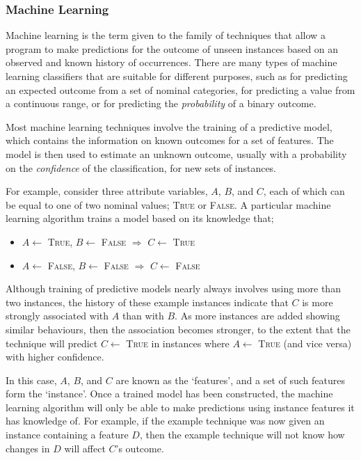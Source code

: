 \subsubsection{Machine Learning}
Machine learning is the term given to the family of techniques that allow a program to make predictions for the outcome of unseen instances based on an observed and known history of occurrences. There are many types of machine learning classifiers that are suitable for different purposes, such as for predicting an expected outcome from a set of nominal categories, for predicting a value from a continuous range, or for predicting the \textit{probability} of a binary outcome.

Most machine learning techniques involve the training of a predictive model, which contains the information on known outcomes for a set of features. The model is then used to estimate an unknown outcome, usually with a probability on the \textit{confidence} of the classification, for new sets of instances.

For example, consider three attribute variables, $A$, $B$, and $C$, each of which can be equal to one of two nominal values; \textsc{True} or \textsc{False}. A particular machine learning algorithm trains a model based on its knowledge that;
\begin{itemize}
    \item $A\gets$ \textsc{True}, $B\gets$ \textsc{False} $\Longrightarrow$ $C\gets$ \textsc{True}
    \item $A\gets$ \textsc{False}, $B\gets$ \textsc{False} $\Longrightarrow$ $C\gets$ \textsc{False}
\end{itemize}
Although training of predictive models nearly always involves using more than two instances, the history of these example instances indicate that $C$ is more strongly associated with $A$ than with $B$. As more instances are added showing similar behaviours, then the association becomes stronger, to the extent that the technique will predict $C\gets$ \textsc{True} in instances where $A\gets$ \textsc{True} (and vice versa) with higher confidence.

In this case, $A$, $B$, and $C$ are known as the `features', and a set of such features form the `instance'. Once a trained model has been constructed, the machine learning algorithm will only be able to make predictions using instance features it has knowledge of. For example, if the example technique was now given an instance containing a feature $D$, then the example technique will not know how changes in $D$ will affect $C$'s outcome.

